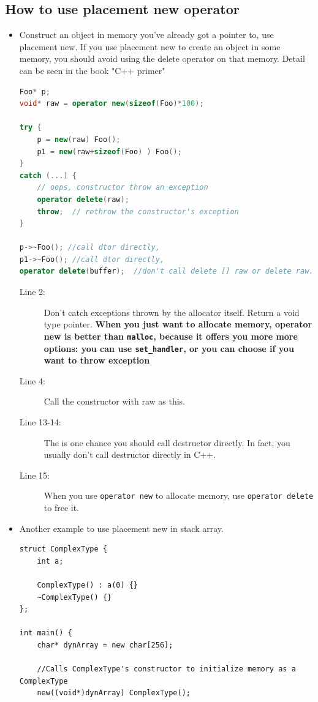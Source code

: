\documentclass[a4paper,11pt,twoside]{book}
\begin{document}
\subsection{How to use placement new operator}
\begin{itemize}
	\item Construct an object in memory you've already got a pointer to, use placement new. If you use placement new to create an object in some memory, you should avoid using the delete operator on that memory.  Detail can be seen in the book "C++ primer"
\begin{lstlisting}[frame=single, language=c++]
Foo* p;
void* raw = operator new(sizeof(Foo)*100);
	
try {
	p = new(raw) Foo();  
	p1 = new(raw+sizeof(Foo) ) Foo();
}
catch (...) {
	// oops, constructor throw an exception
	operator delete(raw);
	throw;  // rethrow the constructor's exception
}

p->~Foo(); //call dtor directly,
p1->~Foo(); //call dtor directly,
operator delete(buffer);  //don't call delete [] raw or delete raw.
\end{lstlisting}
\begin{description}
	\item[Line 2:] Don't catch exceptions thrown by the allocator itself. Return a void type pointer. \textbf{When you just want to allocate memory, operator new is better than \texttt{malloc}, because it offers you more more options: you can use \texttt{set\_handler}, or you can choose if you want to throw exception}
		
	\item[Line 4:] Call the constructor with raw as this.
	\item[Line 13-14:] The is one chance you should call destructor directly. In fact, you usually don't call destructor directly in C++.
	 \item[Line 15:] When you use \texttt{operator new} to allocate memory, use \texttt{operator delete} to free it. 
\end{description}
	
	\item Another example to use placement new in stack array.
\begin{lstlisting}[numbers=none]
struct ComplexType {
	int a;
	
	ComplexType() : a(0) {}
	~ComplexType() {}
};

int main() {
	char* dynArray = new char[256];
	
	//Calls ComplexType's constructor to initialize memory as a ComplexType
	new((void*)dynArray) ComplexType();
	

\end{lstlisting}
\end{itemize}
\end{document}
